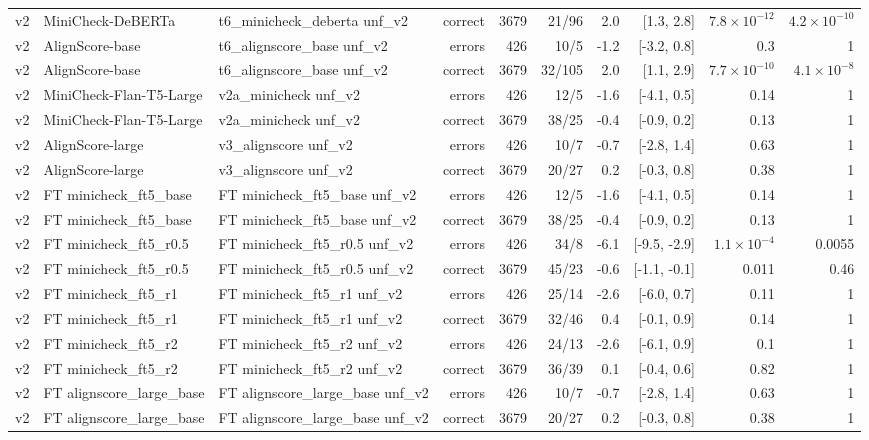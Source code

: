 \begin{scriptsize}
\begin{longtable}{lllrrrrrrr}
v2 & MiniCheck-DeBERTa & t6\_minicheck\_deberta unf\_v2 & correct & 3679 & 21/96 & 2.0 & [1.3, 2.8] & $7.8\times10^{-12}$ & $4.2\times10^{-10}$ \\
v2 & AlignScore-base & t6\_alignscore\_base unf\_v2 & errors & 426 & 10/5 & -1.2 & [-3.2, 0.8] & 0.3 & 1 \\
v2 & AlignScore-base & t6\_alignscore\_base unf\_v2 & correct & 3679 & 32/105 & 2.0 & [1.1, 2.9] & $7.7\times10^{-10}$ & $4.1\times10^{-8}$ \\
v2 & MiniCheck-Flan-T5-Large & v2a\_minicheck unf\_v2 & errors & 426 & 12/5 & -1.6 & [-4.1, 0.5] & 0.14 & 1 \\
v2 & MiniCheck-Flan-T5-Large & v2a\_minicheck unf\_v2 & correct & 3679 & 38/25 & -0.4 & [-0.9, 0.2] & 0.13 & 1 \\
v2 & AlignScore-large & v3\_alignscore unf\_v2 & errors & 426 & 10/7 & -0.7 & [-2.8, 1.4] & 0.63 & 1 \\
v2 & AlignScore-large & v3\_alignscore unf\_v2 & correct & 3679 & 20/27 & 0.2 & [-0.3, 0.8] & 0.38 & 1 \\
v2 & FT minicheck\_ft5\_base & FT minicheck\_ft5\_base unf\_v2 & errors & 426 & 12/5 & -1.6 & [-4.1, 0.5] & 0.14 & 1 \\
v2 & FT minicheck\_ft5\_base & FT minicheck\_ft5\_base unf\_v2 & correct & 3679 & 38/25 & -0.4 & [-0.9, 0.2] & 0.13 & 1 \\
v2 & FT minicheck\_ft5\_r0.5 & FT minicheck\_ft5\_r0.5 unf\_v2 & errors & 426 & 34/8 & -6.1 & [-9.5, -2.9] & $1.1\times10^{-4}$ & 0.0055 \\
v2 & FT minicheck\_ft5\_r0.5 & FT minicheck\_ft5\_r0.5 unf\_v2 & correct & 3679 & 45/23 & -0.6 & [-1.1, -0.1] & 0.011 & 0.46 \\
v2 & FT minicheck\_ft5\_r1 & FT minicheck\_ft5\_r1 unf\_v2 & errors & 426 & 25/14 & -2.6 & [-6.0, 0.7] & 0.11 & 1 \\
v2 & FT minicheck\_ft5\_r1 & FT minicheck\_ft5\_r1 unf\_v2 & correct & 3679 & 32/46 & 0.4 & [-0.1, 0.9] & 0.14 & 1 \\
v2 & FT minicheck\_ft5\_r2 & FT minicheck\_ft5\_r2 unf\_v2 & errors & 426 & 24/13 & -2.6 & [-6.1, 0.9] & 0.1 & 1 \\
v2 & FT minicheck\_ft5\_r2 & FT minicheck\_ft5\_r2 unf\_v2 & correct & 3679 & 36/39 & 0.1 & [-0.4, 0.6] & 0.82 & 1 \\
v2 & FT alignscore\_large\_base & FT alignscore\_large\_base unf\_v2 & errors & 426 & 10/7 & -0.7 & [-2.8, 1.4] & 0.63 & 1 \\
v2 & FT alignscore\_large\_base & FT alignscore\_large\_base unf\_v2 & correct & 3679 & 20/27 & 0.2 & [-0.3, 0.8] & 0.38 & 1 \\

\end{longtable}
\end{scriptsize}
